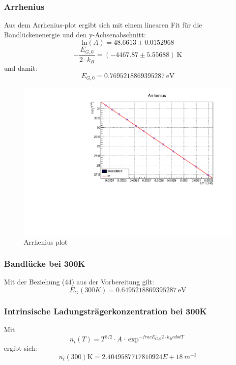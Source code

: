 \subsubsection{Arrhenius}
\FloatBarrier

Aus dem Arrhenius-plot ergibt sich mit einem linearen Fit für die Bandlückenenergie und den y-Achsenabschnitt:
$$\text{ln}(A) = 48.6613 \pm 0.0152968 $$
$$ - \frac{E_{G,0}}{2 \cdot k_B} = (-4467.87 \pm 5.55688 ) \ \text{K}$$
und damit:
$$E_{G,0} = 0.7695218869395287 \ \text{eV} $$

\begin{figure}
\label{fig:leitin}
\centering
\includegraphics[scale = 0.5]{../data/A5.pdf}
\caption{Arrhenius plot}
\end{figure}


\subsubsection{Bandlücke bei 300K}
\FloatBarrier
Mit der Beziehung (44) aus der Vorbereitung gilt:
$$E_G(300K) = 0.6495218869395287 \ \text{eV}$$

\subsubsection{Intrinsische Ladungsträgerkonzentration bei 300K}
\FloatBarrier
Mit 
$$ n_i (T) = T^{3/2} \cdot A \cdot \exp^{- frac{E_{G,0}}{2 \cdot k_B }cdot T}$$
ergibt sich:
$$n_i(300) \text{K} = 2.4049587717810924E+18 \ m^{-3}$$

